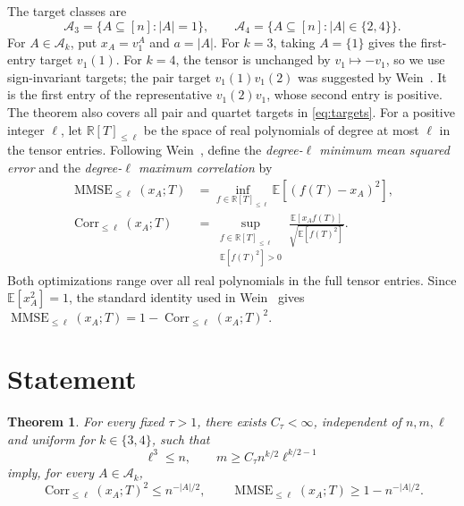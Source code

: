 \documentclass[11pt]{article}
\newtheorem{theorem}{Theorem}
\newcommand{\E}{\mathbb E}
\newcommand{\R}{\mathbb R}
\DeclareMathOperator{\Corr}{Corr}
\DeclareMathOperator{\MMSE}{MMSE}
\begin{document}
The target classes are
\begin{equation}\label{eq:targets}
\mathcal A_3=\{A\subseteq[n]:|A|=1\},
\qquad
\mathcal A_4=\{A\subseteq[n]:|A|\in\{2,4\}\}.
\end{equation}
For \(A\in\mathcal A_k\), put \(x_A=v_1^A\) and \(a=|A|\).
For \(k=3\), taking \(A=\{1\}\) gives the first-entry target \(v_1(1)\).
For \(k=4\), the tensor is unchanged by \(v_1\mapsto-v_1\), so we use sign-invariant targets; the pair target \(v_1(1)v_1(2)\) was suggested by Wein~\cite[Section~2]{Wein2023}.
It is the first entry of the representative \(v_1(2)v_1\), whose second entry is positive.
The theorem also covers all pair and quartet targets in \eqref{eq:targets}.
For a positive integer \(\ell\), let \(\R[T]_{\le\ell}\) be the space of real polynomials of degree at most \(\ell\) in the tensor entries.
Following Wein~\cite[Sections~1.2 and~1.4.1]{Wein2023}, define the \emph{degree-\(\ell\) minimum mean squared error} and the \emph{degree-\(\ell\) maximum correlation} by
\begin{align}
\MMSE_{\le \ell}(x_A;T)
&=\inf_{f\in\R[T]_{\le\ell}}\E[(f(T)-x_A)^2],
\label{eq:mmse}\\
\Corr_{\le \ell}(x_A;T)
&=\sup_{\substack{f\in\R[T]_{\le\ell}\\\E[f(T)^2]>0}}
\frac{\E[x_Af(T)]}{\sqrt{\E[f(T)^2]}} .
\label{eq:corr}
\end{align}
Both optimizations range over all real polynomials in the full tensor entries.
Since \(\E[x_A^2]=1\), the standard identity used in Wein~\cite[Fact~3.1]{Wein2023} gives
\(\MMSE_{\le \ell}(x_A;T)=1-\Corr_{\le \ell}(x_A;T)^2\).

\section{Statement}

\begin{theorem}\label{thm:main}
For every fixed \(\tau>1\), there exists \(C_\tau<\infty\), independent of \(n,m,\ell\) and uniform for \(k\in\{3,4\}\), such that
\begin{equation}\label{eq:hypotheses}
\ell^3\le n,
\qquad
m\ge C_\tau n^{k/2}\ell^{k/2-1}
\end{equation}
imply, for every \(A\in\mathcal A_k\),
\begin{equation}\label{eq:conclusion}
\Corr_{\le \ell}(x_A;T)^2\le n^{-|A|/2},
\qquad
\MMSE_{\le \ell}(x_A;T)\ge1-n^{-|A|/2}.
\end{equation}
\end{theorem}
\end{document}
